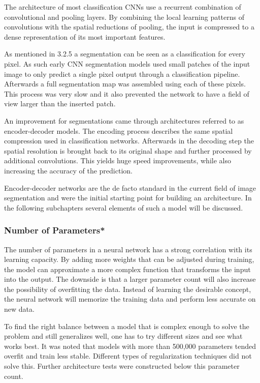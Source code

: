 The architecture of most classification CNNs use a recurrent combination of convolutional and pooling layers. By combining the local learning patterns of convolutions with the spatial reductions of pooling, the input is compressed to a dense representation of its most important features.

As mentioned in 3.2.5 a segmentation can be seen as a classification for every pixel. As such early CNN segmentation models used small patches of the input image to only predict a single pixel output through a classification pipeline. Afterwards a full segmentation map was assembled using each of these pixels. This process was very slow and it also prevented the network to have a field of view larger than the inserted patch.

An improvement for segmentations came through architectures referred to as encoder-decoder models. The encoding process describes the same spatial compression used in classification networks. Afterwards in the decoding step the spatial resolution is brought back to its original shape and further processed by additional convolutions. This yields huge speed improvements, while also increasing the accuracy of the prediction. 

Encoder-decoder networks are the de facto standard in the current field of image segmentation and were the initial starting point for building an architecture. In the following subchapters several elements of such a model will be discussed.

\subsubsection{Number of Parameters*}

The number of parameters in a neural network has a strong correlation with its learning capacity. By adding more weights that can be adjusted during training, the model can approximate a more complex function that transforms the input into the output. The downside is that a larger parameter count will also increase the possibility of overfitting the data. Instead of learning the desirable concept, the neural network will memorize the training data and perform less accurate on new data.

To find the right balance between a model that is complex enough to solve the problem and still generalizes well, one has to try different sizes and see what works best. It was noted that models with more than 500,000 parameters tended overfit and train less stable. Different types of regularization techniques did not solve this. Further architecture tests were constructed below this parameter count.

